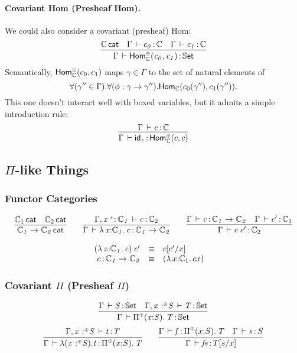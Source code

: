 \documentclass[11pt]{article}
\theoremstyle{plain}
\begin{document}
\paragraph{Covariant Hom (Presheaf Hom).}
We could also consider a covariant (presheaf) Hom:
\[
	\infer{
		\ofdtp{\Gamma}{\Hombind{\C}{\coc}{c_0}{c_1}}{\types}
	}{
		\wfdtp{\C} &
		\oftp{\Gamma}{c_0}{\C} & 
		\oftp{\Gamma}{c_1}{\C} 
	}
\]
Semantically, $\mathsf{Hom}_{\mathbb{C}}^{{\text{\tiny $\mathord{\oplus}$}}}(c_0,c_1)$ maps $\gamma \in \Gamma$ to the set of natural elements of
\[
	\forall (\gamma'' \in \Gamma). \forall (\phi : \gamma \to \gamma'').\mathsf{Hom}_{\mathbb{C}}(c_0(\gamma''),c_1(\gamma'')).
\]
This one doesn't interact well with boxed variables, but it admits a simple introduction rule:
\[
	\infer{
		\oftp{\Gamma}{\idm c}{\Hombind{\C}{\coc}{c}{c}}
	}{
		\oftp{\Gamma}{c}{\C}
	}
\]

\subsection{$\Pi$-like Things}

\subsubsection{Functor Categories}

\[
\begin{array}{c}
\infer{\wfdtp{\arr{\C_1}{\C_2}}}
      {\wfdtp{\C_1} &
        \wfdtp{\C_2}}
\qquad
\infer{\ofdtp{\Gamma}{\lam{x}{\C_1}{c}}{\arr {\C_1} {\C_2}}}
      {\ofdtp{\Gamma,\vptptm{x}{\co}{\C_1}}{c}{\C_2}}
\qquad
\infer{\ofdtp{\Gamma}{\app c {c'}}{\C_2}}
      {\ofdtp{\Gamma}{c}{\arr{\C_1}{\C_2}} &
        \ofdtp{\Gamma}{c'}{\C_1}}
\end{array}
\]

\[
\begin{array}{rcll}
\mathit{({\lambda\,x \mathit{:} \mathbb{C}_1.\,c}) \: c'} & \equiv & c [ c' / x ] \\
c \, \mathit{:} \, \mathit{\mathbb{C}_1}\rightarrow_{\mathit{}} \mathit{\mathbb{C}_2} & \equiv & {({\lambda\,x \mathit{:} \mathbb{C}_1.\,c}{x})} &
\end{array} \\
\]

\subsubsection{Covariant $\Pi$ (Presheaf $\Pi$)}
\begin{equation}
	\infer{
		\oftp{\Gamma}{\pico{x}{S}{T}}{\types}
	}{
		\oftp{\Gamma}{S}{\types} &
		\oftp{\Gamma, \tpvar x \coc S}{T}{\types}
	}
\end{equation}
\begin{equation}
	\infer{
		\oftp{\Gamma}{\laco x S t}{\pico{x}{S}{T}}
	}{
		\oftp{\Gamma, \tpvar x \coc S}{t}{T}
	}
	\qquad
	\infer{
		\oftp{\Gamma}{f s}{T[s/x]}
	}{
		\oftp{\Gamma}{f}{\pico{x}{S}{T}} &
		\oftp{\Gamma}{s}{S}
	}
\end{equation}
\end{document}
